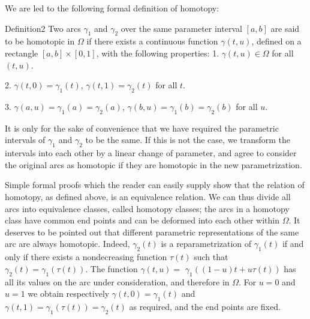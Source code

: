 We are led to the following formal definition of homotopy:

\begin{originalstatement}{Definition}{2}\label{def:8.2}
Two arcs $\gamma_{1}$ and $\gamma_{2}$ over the same parameter interval $[a,b]$ are said to be homotopic in $\Omega$ if there exists a continuous function $\gamma(t,u)$, defined on a rectangle $[a,b] \times [0,1]$, with the following properties:
1. $\gamma(t,u) \in \Omega$ for all $(t,u)$.

2. $\gamma(t,0) = \gamma_1(t)$, $\gamma(t,1) = \gamma_2(t)$ for all $t$.

3. $\gamma(a,u) = \gamma_1(a) = \gamma_2(a)$, $\gamma(b,u) = \gamma_1(b) = \gamma_2(b)$ for all $u$.
\end{originalstatement}
It is only for the sake of convenience that we have required the parametric intervals of $\gamma_{1}$ and $\gamma_{2}$ to be the same. If this is not the case, we transform the intervals into each other by a linear change of parameter, and agree to consider the original arcs as homotopic if they are homotopic in the new parametrization.

Simple formal proofs which the reader can easily supply show that the relation of homotopy, as defined above, is an equivalence relation. We can thus divide all arcs into equivalence classes, called homotopy classes; the arcs in a homotopy class have common end points and can be deformed into each other within $\Omega$. It deserves to be pointed out that different parametric representations of the same arc are always homotopic. Indeed, $\gamma_{2}(t)$ is a reparametrization of $\gamma_{1}(t)$ if and only if there exists a nondecreasing function $\tau(t)$ such that $\gamma_{2}(t) = \gamma_{1}(\tau(t))$. The function $\gamma(t,u) =$
$\gamma_{1}((1 - u)t + u\tau(t))$ has all its values on the arc under consideration, and therefore in $\Omega$. For $u = 0$ and $u = 1$ we obtain respectively $\gamma(t,0) = \gamma_{1}(t)$ and $\gamma(t,1) = \gamma_{1}(\tau(t)) = \gamma_{2}(t)$ as required, and the end points are fixed.

